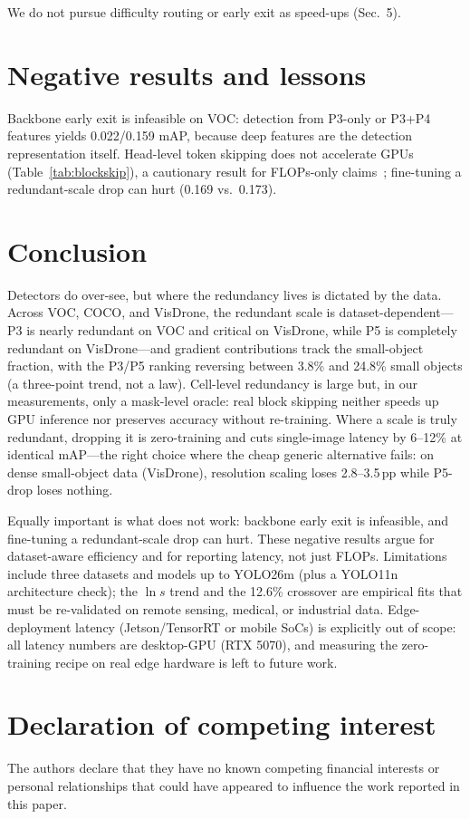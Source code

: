 \documentclass[3p]{elsarticle}
\begin{document}
We do not pursue difficulty routing or early exit as speed-ups (Sec.~5).

\section{Negative results and lessons}
Backbone early exit is infeasible on VOC: detection from P3-only or P3+P4 features yields 0.022/0.159 mAP, because deep features are the detection representation itself. Head-level token skipping does not accelerate GPUs (Table~\ref{tab:blockskip}), a cautionary result for FLOPs-only claims~\cite{rao2021dynamicvit,liang2022evit}; fine-tuning a redundant-scale drop can hurt (0.169 vs.\ 0.173).

\section{Conclusion}
Detectors do over-see, but where the redundancy lives is dictated by the data. Across VOC, COCO, and VisDrone, the redundant scale is dataset-dependent---P3 is nearly redundant on VOC and critical on VisDrone, while P5 is completely redundant on VisDrone---and gradient contributions track the small-object fraction, with the P3/P5 ranking reversing between 3.8\% and 24.8\% small objects (a three-point trend, not a law). Cell-level redundancy is large but, in our measurements, only a mask-level oracle: real block skipping neither speeds up GPU inference nor preserves accuracy without re-training. Where a scale is truly redundant, dropping it is zero-training and cuts single-image latency by 6--12\% at identical mAP---the right choice where the cheap generic alternative fails: on dense small-object data (VisDrone), resolution scaling loses 2.8--3.5\,pp while P5-drop loses nothing.

Equally important is what does not work: backbone early exit is infeasible, and fine-tuning a redundant-scale drop can hurt. These negative results argue for dataset-aware efficiency and for reporting latency, not just FLOPs. Limitations include three datasets and models up to YOLO26m (plus a YOLO11n architecture check); the $\ln s$ trend and the 12.6\% crossover are empirical fits that must be re-validated on remote sensing, medical, or industrial data. Edge-deployment latency (Jetson/TensorRT or mobile SoCs) is explicitly out of scope: all latency numbers are desktop-GPU (RTX 5070), and measuring the zero-training recipe on real edge hardware is left to future work.
\section*{Declaration of competing interest}
The authors declare that they have no known competing financial interests or personal relationships that could have appeared to influence the work reported in this paper.
\end{document}
